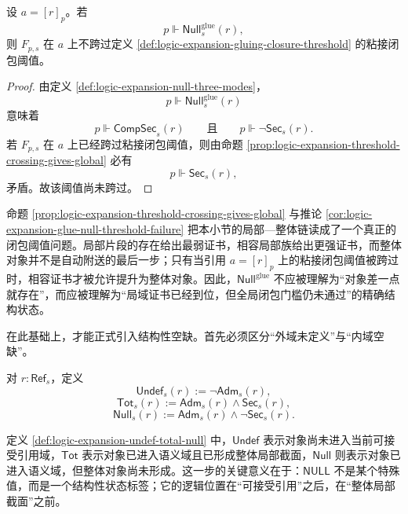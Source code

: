 \begin{corollary}\label{cor:logic-expansion-glue-null-threshold-failure}
设 \(a=[r]_p\)。若
\[
p\Vdash \mathsf{Null}^{\mathrm{glue}}_s(r),
\]
则 \(F_{p,s}\) 在 \(a\) 上不跨过定义 \ref{def:logic-expansion-gluing-closure-threshold} 的粘接闭包阈值。
\end{corollary}

\begin{proof}
由定义 \ref{def:logic-expansion-null-three-modes}，
\[
p\Vdash \mathsf{Null}^{\mathrm{glue}}_s(r)
\]
意味着
\[
p\Vdash \mathsf{CompSec}_s(r)
\qquad\text{且}\qquad
p\Vdash \neg \mathsf{Sec}_s(r).
\]
若 \(F_{p,s}\) 在 \(a\) 上已经跨过粘接闭包阈值，则由命题 \ref{prop:logic-expansion-threshold-crossing-gives-global} 必有
\[
p\Vdash \mathsf{Sec}_s(r),
\]
矛盾。故该阈值尚未跨过。
\end{proof}

\begin{remark}[从局域证书到整体对象的阈值读法]\label{rem:logic-expansion-local-global-threshold-reading}
命题 \ref{prop:logic-expansion-threshold-crossing-gives-global} 与推论 \ref{cor:logic-expansion-glue-null-threshold-failure} 把本小节的局部—整体链读成了一个真正的闭包阈值问题。局部片段的存在给出最弱证书，相容局部族给出更强证书，而整体对象并不是自动附送的最后一步；只有当引用 \(a=[r]_p\) 上的粘接闭包阈值被跨过时，相容证书才被允许提升为整体对象。因此，\(\mathsf{Null}^{\mathrm{glue}}\) 不应被理解为“对象差一点就存在”，而应被理解为“局域证书已经到位，但全局闭包门槛仍未通过”的精确结构状态。
\end{remark}

在此基础上，才能正式引入结构性空缺。首先必须区分“外域未定义”与“内域空缺”。

\begin{definition}\label{def:logic-expansion-undef-total-null}
对 \(r:\mathsf{Ref}_s\)，定义
\[
\mathsf{Undef}_s(r):=\neg \mathsf{Adm}_s(r),
\]
\[
\mathsf{Tot}_s(r):=\mathsf{Adm}_s(r)\land \mathsf{Sec}_s(r),
\]
\[
\mathsf{Null}_s(r):=\mathsf{Adm}_s(r)\land \neg \mathsf{Sec}_s(r).
\]
\end{definition}

定义 \ref{def:logic-expansion-undef-total-null} 中，\(\mathsf{Undef}\) 表示对象尚未进入当前可接受引用域，\(\mathsf{Tot}\) 表示对象已进入语义域且已形成整体局部截面，\(\mathsf{Null}\) 则表示对象已进入语义域，但整体对象尚未形成。这一步的关键意义在于：\(\mathsf{NULL}\) 不是某个特殊值，而是一个结构性状态标签；它的逻辑位置在“可接受引用”之后，在“整体局部截面”之前。

